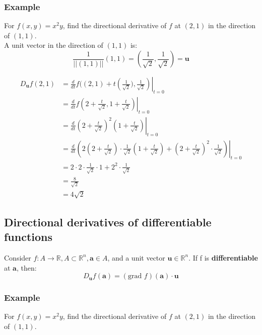 \documentclass[11pt]{article}
\begin{document}
\subsubsection{Example}
\label{sec:org4ff152d}
For \(f(x, y) = x^2 y\), find the directional derivative of \(f\) at \((2, 1)\) in the direction of \((1, 1)\).
\\[0pt]

A unit vector in the direction of \((1, 1)\) is:
\[\frac{1}{||(1, 1)||} (1, 1) = \left(\frac{1}{\sqrt{2}}, \frac{1}{\sqrt{2}} \right) = \boldsymbol{u}\]

\begin{align*}
D_{\boldsymbol{u}} f(2, 1) &= \frac{d}{dt} f((2, 1) + t \left. \left(\frac{1}{\sqrt{2}}), \frac{1}{\sqrt{2}} \right) \right|_{t = 0} \\
&= \frac{d}{dt} f \left. \left(2 + \frac{t}{\sqrt{2}}, 1 + \frac{t}{\sqrt{2}} \right) \right|_{t = 0} \\
&= \frac{d}{dt} \left. \left(2 + \frac{t}{\sqrt{2}} \right)^2 \left(1 + \frac{t}{\sqrt{2}} \right) \right|_{t = 0} \\
&= \frac{d}{dt} \left. \left(2 \left(2 + \frac{t}{\sqrt{2}} \right) \cdot \frac{1}{\sqrt{2}} \left( 1 + \frac{t}{\sqrt{2}} \right) + \left( 2 + \frac{t}{\sqrt{2}} \right)^2 \cdot \frac{1}{\sqrt{2}} \right) \right|_{t = 0} \\
&= 2 \cdot 2 \cdot \frac{1}{\sqrt{2}} \cdot 1 + 2^2 \cdot \frac{1}{\sqrt{2}} \\
&= \frac{8}{\sqrt{2}} \\
&= 4 \sqrt{2}
\end{align*}

\subsection{Directional derivatives of differentiable functions}
\label{sec:orge797d33}
Consider \(f : A \rightarrow \mathbb{R}, A \subset \mathbb{R}^n, \boldsymbol{a} \in A\), and a unit vector \(\boldsymbol{u} \in \mathbb{R}^n\). If f is \textbf{differentiable} at \(\boldsymbol{a}\), then:
\[D_{\boldsymbol{u}} f(\boldsymbol{a}) = (\text{grad } f) (\boldsymbol{a}) \cdot \boldsymbol{u}\]

\subsubsection{Example}
\label{sec:orgcca5ab5}
For \(f(x, y) = x^2 y\), find the directional derivative of \(f\) at \((2, 1)\) in the direction of \((1, 1)\).
\\[0pt]
\end{document}
